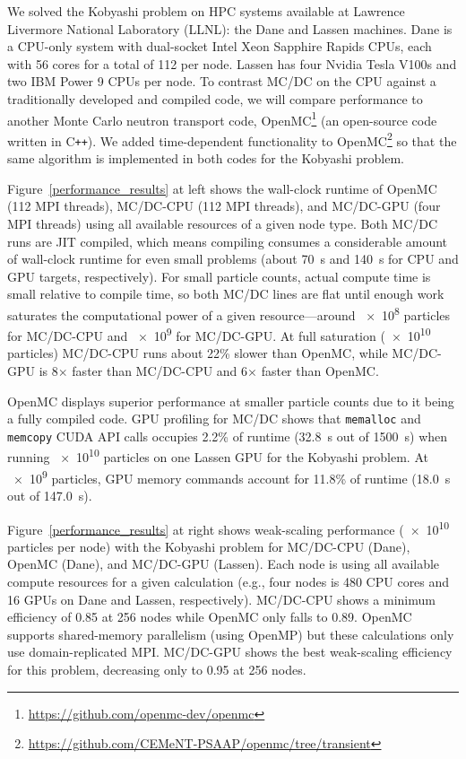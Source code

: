 We solved the Kobyashi problem on HPC systems available at Lawrence Livermore National Laboratory (LLNL): the Dane and Lassen machines.
Dane is a CPU-only system with dual-socket Intel Xeon Sapphire Rapids CPUs, each with 56 cores for a total of 112 per node.
Lassen has four Nvidia Tesla V100s and two IBM Power 9 CPUs per node.
To contrast MC/DC on the CPU against a traditionally developed and compiled code, we will compare performance to another Monte Carlo neutron transport code, OpenMC\footnote{\url{https://github.com/openmc-dev/openmc}} \cite{romano_openmc_2015} (an open-source code written in C\texttt{++}).
We added time-dependent functionality to OpenMC\footnote{\url{https://github.com/CEMeNT-PSAAP/openmc/tree/transient}} so that the same algorithm is implemented in both codes for the Kobyashi problem.


Figure~\ref{performance_results} at left shows the wall-clock runtime of OpenMC (112 MPI threads), MC/DC-CPU (112 MPI threads), and MC/DC-GPU (four MPI threads) using all available resources of a given node type.
Both MC/DC runs are JIT compiled, which means compiling consumes a considerable amount of wall-clock runtime for even small problems (about \SI{70}{\s} and \SI{140}{\s} for CPU and GPU targets, respectively).
For small particle counts, actual compute time is small relative to compile time, so both MC/DC lines are flat until enough work saturates the computational power of a given resource---around \num{e8} particles for MC/DC-CPU and \num{e9} for MC/DC-GPU.
At full saturation (\num{e10} particles) MC/DC-CPU runs about 22\% slower than OpenMC, while MC/DC-GPU is 8$\times$ faster than MC/DC-CPU and 6$\times$ faster than OpenMC.

OpenMC displays superior performance at smaller particle counts due to it being a fully compiled code.
GPU profiling for MC/DC shows that
\texttt{memalloc} and \texttt{memcopy} CUDA API calls 
occupies 2.2\% of runtime (\SI{32.8}{\s} out of \SI{1500}{\s})
when running \num{e10} particles on one Lassen GPU for the Kobyashi problem.
At \num{e9} particles, GPU memory commands account for 11.8\% of runtime (\SI{18.0}{\s} out of \SI{147.0}{\s}).


Figure~\ref{performance_results} at right shows weak-scaling performance (\num{e10} particles per node) with the Kobyashi problem for MC/DC-CPU (Dane), OpenMC (Dane), and MC/DC-GPU (Lassen).
Each node is using all available compute resources for a given calculation (e.g., four nodes is 480 CPU cores and 16 GPUs on Dane and Lassen, respectively).
MC/DC-CPU shows a minimum efficiency of \num{0.85} at 256 nodes while OpenMC only falls to \num{0.89}.
OpenMC supports shared-memory parallelism (using OpenMP) but these calculations only use domain-replicated MPI.
MC/DC-GPU shows the best weak-scaling efficiency for this problem, decreasing only to \num{0.95} at 256 nodes.

